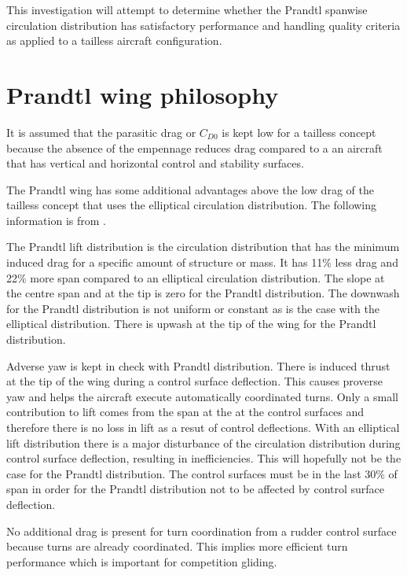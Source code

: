 \documentclass{report}
\begin{document}
This investigation will attempt to determine whether the Prandtl spanwise circulation distribution has satisfactory performance and handling quality criteria as applied to a tailless aircraft configuration.

\section{Prandtl wing philosophy}

It is assumed that the parasitic drag or $C_{D0}$ is kept low for a tailless concept because the absence of the empennage reduces drag compared to a an aircraft that has vertical and horizontal control and stability surfaces.

The Prandtl wing has some additional advantages above the low drag of the tailless concept that uses the elliptical circulation distribution.  The following information is from \cite{omegataupodcastPrandtl}.

The Prandtl lift distribution is the circulation distribution that has the minimum induced drag for a specific amount of structure or mass.  It has 11\% less drag and 22\% more span compared to an elliptical circulation distribution.  The slope at the centre span and at the tip is zero for the Prandtl distribution.  The downwash for the Prandtl distribution is not uniform or constant as is the case with the elliptical distribution.  There is upwash at the tip of the wing for the Prandtl distribution.

Adverse yaw is kept in check with Prandtl distribution.  There is induced thrust at the tip of the wing during a control surface deflection.  This causes proverse yaw and helps the aircraft execute automatically coordinated turns.  Only a small contribution to lift comes from the span at the at the control surfaces and therefore there is no loss in lift as a resut of control deflections.  With an elliptical lift distribution there is a major disturbance of the circulation distribution during control surface deflection, resulting in inefficiencies.  This will hopefully not be the case for the Prandtl distribution.  The control surfaces must be in the last 30\% of span in order for the Prandtl distribution not to be affected by control surface deflection.

No additional drag is present for turn coordination from a rudder control surface because turns are already coordinated. This implies more efficient turn performance which is important for competition gliding.
\end{document}
